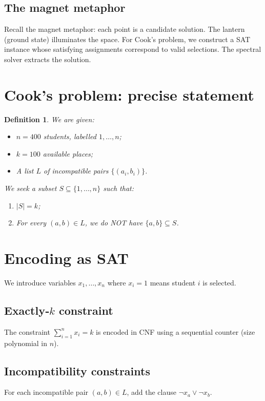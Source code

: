 \documentclass[11pt,a4paper]{article}
\newtheorem{definition}[theorem]{Definition}
\begin{document}
\subsection{The magnet metaphor}

Recall the magnet metaphor: each point is a candidate solution. The lantern (ground state) illuminates the space. For Cook's problem, we construct a SAT instance whose satisfying assignments correspond to valid selections. The spectral solver extracts the solution.

\section{Cook's problem: precise statement}
\begin{definition}
We are given:
\begin{itemize}
\item \(n = 400\) students, labelled \(1,\ldots,n\);
\item \(k = 100\) available places;
\item A list \(L\) of incompatible pairs \(\{(a_i,b_i)\}\).
\end{itemize}
We seek a subset \(S\subseteq \{1,\ldots,n\}\) such that:
\begin{enumerate}
\item \(|S| = k\);
\item For every \((a,b)\in L\), we do NOT have \(\{a,b\}\subseteq S\).
\end{enumerate}
\end{definition}

\section{Encoding as SAT}
We introduce variables \(x_1,\ldots,x_n\) where \(x_i=1\) means student \(i\) is selected.

\subsection{Exactly‑\(k\) constraint}
The constraint \(\sum_{i=1}^n x_i = k\) is encoded in CNF using a sequential counter (size polynomial in \(n\)).

\subsection{Incompatibility constraints}
For each incompatible pair \((a,b)\in L\), add the clause \(\neg x_a \vee \neg x_b\).
\end{document}
